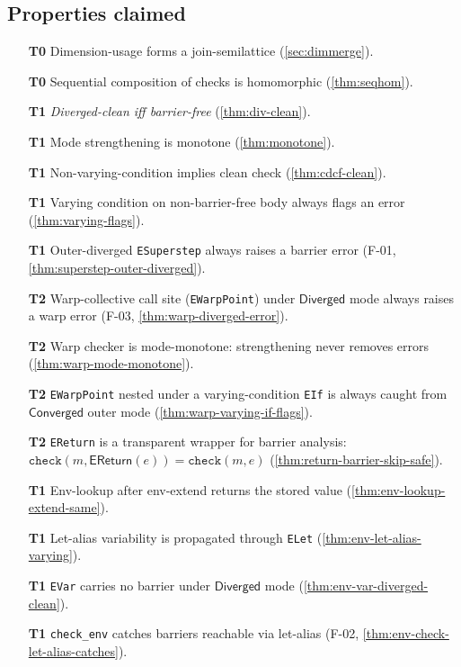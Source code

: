 \documentclass[11pt,a4paper]{article}
\theoremstyle{definition}
\theoremstyle{plain}
\theoremstyle{remark}
\newcommand{\Converged}{\mathsf{Converged}}
\newcommand{\Diverged}{\mathsf{Diverged}}
\begin{document}
\subsection*{Properties claimed}

\begin{enumerate}
  \item[\textbf{T0}] Dimension-usage forms a join-semilattice (\cref{sec:dimmerge}).
  \item[\textbf{T0}] Sequential composition of checks is homomorphic (\cref{thm:seqhom}).
  \item[\textbf{T1}] \emph{Diverged-clean iff barrier-free} (\cref{thm:div-clean}).
  \item[\textbf{T1}] Mode strengthening is monotone (\cref{thm:monotone}).
  \item[\textbf{T1}] Non-varying-condition implies clean check (\cref{thm:cdcf-clean}).
  \item[\textbf{T1}] Varying condition on non-barrier-free body always flags an error
        (\cref{thm:varying-flags}).
  \item[\textbf{T1}] Outer-diverged \texttt{ESuperstep} always raises a barrier error
        (F-01, \cref{thm:superstep-outer-diverged}).
  \item[\textbf{T2}] Warp-collective call site (\texttt{EWarpPoint}) under $\Diverged$ mode
        always raises a warp error (F-03, \cref{thm:warp-diverged-error}).
  \item[\textbf{T2}] Warp checker is mode-monotone: strengthening never removes errors
        (\cref{thm:warp-mode-monotone}).
  \item[\textbf{T2}] \texttt{EWarpPoint} nested under a varying-condition \texttt{EIf} is
        always caught from $\Converged$ outer mode
        (\cref{thm:warp-varying-if-flags}).
  \item[\textbf{T2}] \texttt{EReturn} is a transparent wrapper for barrier analysis:
        $\mathtt{check}(m, \mathsf{EReturn}(e)) = \mathtt{check}(m, e)$
        (\cref{thm:return-barrier-skip-safe}).
  \item[\textbf{T1}] Env-lookup after env-extend returns the stored value
        (\cref{thm:env-lookup-extend-same}).
  \item[\textbf{T1}] Let-alias variability is propagated through \texttt{ELet}
        (\cref{thm:env-let-alias-varying}).
  \item[\textbf{T1}] \texttt{EVar} carries no barrier under $\Diverged$ mode
        (\cref{thm:env-var-diverged-clean}).
  \item[\textbf{T1}] \texttt{check\_env} catches barriers reachable via let-alias
        (F-02, \cref{thm:env-check-let-alias-catches}).
\end{enumerate}
\end{document}
